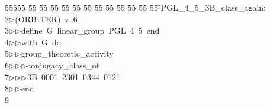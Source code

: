 %
%
\begin{tabbing}
55555 \= 55 \= 55 \= 55 \= 55 \= 55 \= 55 \= 55 \= 55 \= 55 \= 55 \= 55 \= 55 \= \>PGL\_4\_5\_3B\_class\_again:\\[0pt]
2\>$\triangleright$\>(ORBITER)\ v\ 6\ \\[0pt]
3\>$\triangleright$\>$\triangleright$\>define\ G\ linear\_group\ PGL\ 4\ 5\ end\ \\[0pt]
4\>$\triangleright$\>$\triangleright$\>with\ G\ do\ \\[0pt]
5\>$\triangleright$\>$\triangleright$\>group\_theoretic\_activity\ \\[0pt]
6\>$\triangleright$\>$\triangleright$\>$\triangleright$\>conjugacy\_class\_of\ \\[0pt]
7\>$\triangleright$\>$\triangleright$\>$\triangleright$\>3B\ 0001\ 2301\ 0344\ 0121\ \\[0pt]
8\>$\triangleright$\>$\triangleright$\>end\\[0pt]
9\>\end{tabbing}
